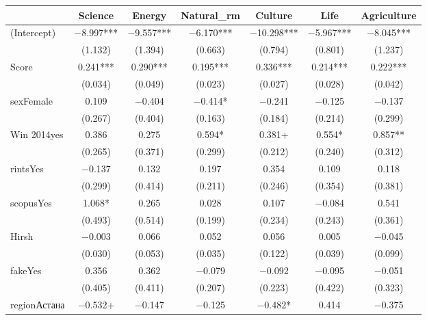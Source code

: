 \begin{table}
\centering
\begin{tabular}[t]{lcccccc}
\toprule
  & Science & Energy & Natural\_rm & Culture & Life & Agriculture\\
\midrule
(Intercept) & \num{-8.997}*** & \num{-9.557}*** & \num{-6.170}*** & \num{-10.298}*** & \num{-5.967}*** & \num{-8.045}***\\
 & (\num{1.132}) & (\num{1.394}) & (\num{0.663}) & (\num{0.794}) & (\num{0.801}) & (\num{1.237})\\
Score & \num{0.241}*** & \num{0.290}*** & \num{0.195}*** & \num{0.336}*** & \num{0.214}*** & \num{0.222}***\\
 & (\num{0.034}) & (\num{0.049}) & (\num{0.023}) & (\num{0.027}) & (\num{0.028}) & (\num{0.042})\\
sexFemale & \num{0.109} & \num{-0.404} & \num{-0.414}* & \num{-0.241} & \num{-0.125} & \num{-0.137}\\
 & (\num{0.267}) & (\num{0.404}) & (\num{0.163}) & (\num{0.184}) & (\num{0.214}) & (\num{0.299})\\
Win 2014yes & \num{0.386} & \num{0.275} & \num{0.594}* & \num{0.381}+ & \num{0.554}* & \num{0.857}**\\
 & (\num{0.265}) & (\num{0.371}) & (\num{0.299}) & (\num{0.212}) & (\num{0.240}) & (\num{0.312})\\
rintsYes & \num{-0.137} & \num{0.132} & \num{0.197} & \num{0.354} & \num{0.109} & \num{0.118}\\
 & (\num{0.299}) & (\num{0.414}) & (\num{0.211}) & (\num{0.246}) & (\num{0.354}) & (\num{0.381})\\
scopusYes & \num{1.068}* & \num{0.265} & \num{0.028} & \num{0.107} & \num{-0.084} & \num{0.541}\\
 & (\num{0.493}) & (\num{0.514}) & (\num{0.199}) & (\num{0.234}) & (\num{0.243}) & (\num{0.361})\\
Hirsh & \num{-0.003} & \num{0.066} & \num{0.052} & \num{0.056} & \num{0.005} & \num{-0.045}\\
 & (\num{0.030}) & (\num{0.053}) & (\num{0.035}) & (\num{0.122}) & (\num{0.039}) & (\num{0.099})\\
fakeYes & \num{0.356} & \num{0.362} & \num{-0.079} & \num{-0.092} & \num{-0.095} & \num{-0.051}\\
 & (\num{0.405}) & (\num{0.411}) & (\num{0.207}) & (\num{0.223}) & (\num{0.422}) & (\num{0.323})\\
regionАстана & \num{-0.532}+ & \num{-0.147} & \num{-0.125} & \num{-0.482}* & \num{0.414} & \num{-0.375}\\

\end{tabular}
\end{table}
